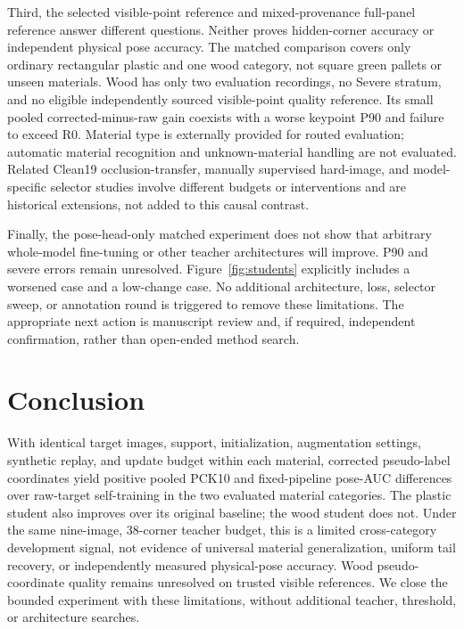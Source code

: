 \documentclass[journal]{IEEEtran}
\begin{document}
Third, the selected visible-point reference and mixed-provenance full-panel reference answer different questions. Neither proves hidden-corner accuracy or independent physical pose accuracy. The matched comparison covers only ordinary rectangular plastic and one wood category, not square green pallets or unseen materials. Wood has only two evaluation recordings, no Severe stratum, and no eligible independently sourced visible-point quality reference. Its small pooled corrected-minus-raw gain coexists with a worse keypoint P90 and failure to exceed R0. Material type is externally provided for routed evaluation; automatic material recognition and unknown-material handling are not evaluated. Related Clean19 occlusion-transfer, manually supervised hard-image, and model-specific selector studies involve different budgets or interventions and are historical extensions, not added to this causal contrast.

Finally, the pose-head-only matched experiment does not show that arbitrary whole-model fine-tuning or other teacher architectures will improve. P90 and severe errors remain unresolved. Figure~\ref{fig:students} explicitly includes a worsened case and a low-change case. No additional architecture, loss, selector sweep, or annotation round is triggered to remove these limitations. The appropriate next action is manuscript review and, if required, independent confirmation, rather than open-ended method search.

\section{Conclusion}
With identical target images, support, initialization, augmentation settings, synthetic replay, and update budget within each material, corrected pseudo-label coordinates yield positive pooled PCK10 and fixed-pipeline pose-AUC differences over raw-target self-training in the two evaluated material categories. The plastic student also improves over its original baseline; the wood student does not. Under the same nine-image, 38-corner teacher budget, this is a limited cross-category development signal, not evidence of universal material generalization, uniform tail recovery, or independently measured physical-pose accuracy. Wood pseudo-coordinate quality remains unresolved on trusted visible references. We close the bounded experiment with these limitations, without additional teacher, threshold, or architecture searches.

\appendices
\end{document}
